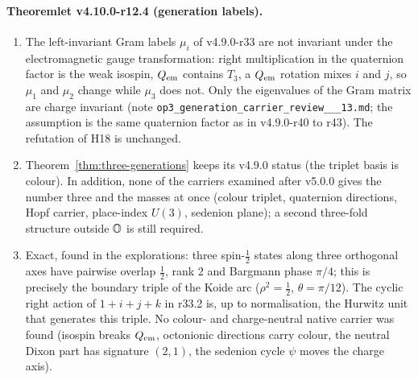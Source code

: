 \paragraph{Theoremlet v4.10.0-r12.4 (generation labels).}
\begin{enumerate}[leftmargin=2em]
\item[(a)] The left-invariant Gram labels \(\mu_i\) of v4.9.0-r33 are not invariant under the electromagnetic gauge
transformation: right multiplication in the quaternion factor is the weak isospin, \(Q_{\rm em}\) contains \(T_3\), a
\(Q_{\rm em}\) rotation mixes \(i\) and \(j\), so \(\mu_1\) and \(\mu_2\) change while \(\mu_3\) does not.  Only the eigenvalues of
the Gram matrix are charge invariant (note \texttt{op3\_\allowbreak generation\_\allowbreak carrier\_\allowbreak review\_\_\_\allowbreak 13.md};
the assumption is the same quaternion factor as in v4.9.0-r40 to r43).  The refutation of H18 is unchanged.
\item[(b)] Theorem~\ref{thm:three-generations} keeps its v4.9.0 status (the triplet basis is colour).  In addition, none of the
carriers examined after v5.0.0 gives the number three and the masses at once (colour triplet, quaternion directions, Hopf
carrier, place-index \(U(3)\), sedenion plane); a second three-fold structure outside \(\mathbb{O}\) is still required.
\item[(c)] Exact, found in the explorations: three spin-\(\tfrac12\) states along three orthogonal axes have pairwise overlap
\(\tfrac12\), rank \(2\) and Bargmann phase \(\pi/4\); this is precisely the boundary triple of the Koide arc
(\(\rho^2=\tfrac12\), \(\theta=\pi/12\)).  The cyclic right action of \(1+i+j+k\) in r33.2 is, up to normalisation, the
Hurwitz unit that generates this triple.  No colour- and charge-neutral native carrier was found (isospin breaks
\(Q_{\rm em}\), octonionic directions carry colour, the neutral Dixon part has signature \((2,1)\), the sedenion cycle \(\psi\)
moves the charge axis).
\end{enumerate}


